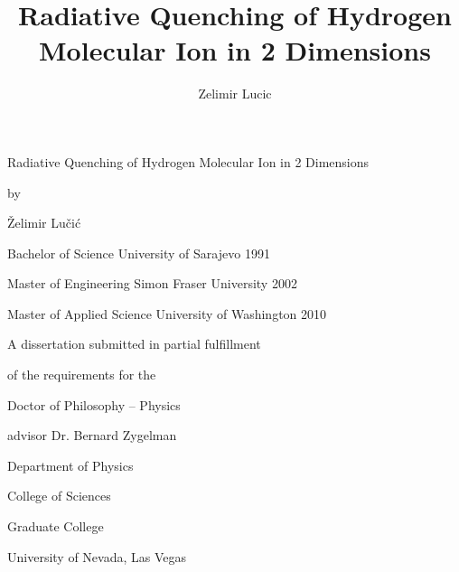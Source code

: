 
\begin{titlepage}
   \begin{center}
       \vspace*{1cm}

Radiative Quenching of Hydrogen Molecular Ion in 2 Dimensions
\title{Radiative Quenching of Hydrogen Molecular Ion  in 2 Dimensions}
\vspace{1.5cm}

by 

Želimir Lučić
\author{Zelimir Lucic}
\vspace{1.5cm}

Bachelor of Science
University of Sarajevo
1991

Master of Engineering
Simon Fraser University
2002

Master of Applied Science
University of Washington
2010

\vfill

A dissertation submitted in partial fulfillment

of the requirements for the

Doctor of Philosophy – Physics
\vspace{1cm}

advisor
Dr. Bernard Zygelman

\vspace{1cm}
Department of Physics

College of Sciences

Graduate College

University of Nevada, Las Vegas

\end{center}
\end{titlepage}

